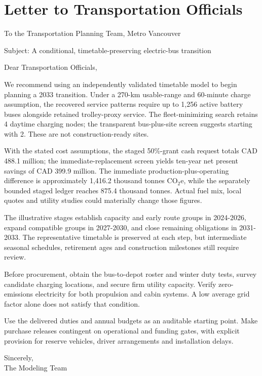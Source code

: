 \clearpage


\section{Letter to Transportation Officials}

\begingroup\setlength{\parindent}{0pt}\setlength{\parskip}{7pt}

To the Transportation Planning Team, Metro Vancouver


Subject: A conditional, timetable-preserving electric-bus transition


Dear Transportation Officials,


We recommend using an independently validated timetable model to begin planning a 2033 transition. Under a 270-km usable-range and 60-minute charge assumption, the recovered service patterns require up to 1,256 active battery buses alongside retained trolley-proxy service. The fleet-minimizing search retains 4 daytime charging nodes; the transparent bus-plus-site screen suggests starting with 2. These are not construction-ready sites.


With the stated cost assumptions, the staged 50\%-grant cash request totals CAD 488.1 million; the immediate-replacement screen yields ten-year net present savings of CAD 399.9 million. The immediate production-plus-operating difference is approximately 1,416.2 thousand tonnes CO$_2$e, while the separately bounded staged ledger reaches 875.4 thousand tonnes. Actual fuel mix, local quotes and utility studies could materially change those figures.


The illustrative stages establish capacity and early route groups in 2024-2026, expand compatible groups in 2027-2030, and close remaining obligations in 2031-2033. The representative timetable is preserved at each step, but intermediate seasonal schedules, retirement ages and construction milestones still require review.


Before procurement, obtain the bus-to-depot roster and winter duty tests, survey candidate charging locations, and secure firm utility capacity. Verify zero-emissions electricity for both propulsion and cabin systems. A low average grid factor alone does not satisfy that condition.


Use the delivered duties and annual budgets as an auditable starting point. Make purchase releases contingent on operational and funding gates, with explicit provision for reserve vehicles, driver arrangements and installation delays.


Sincerely,\\The Modeling Team

\endgroup
